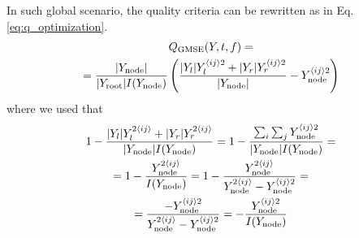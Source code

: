 In such global scenario, the quality criteria can be rewritten as in Eq. \ref{eq:q_optimization}.
%
\begin{multline}
    Q_\text{GMSE}(Y, t, f)
        =\\
            =\frac{|Y_\text{node}|}{|Y_\text{root}|I(Y_\text{node})}
            \left(
                \frac{
                    |Y_l|Y_l^{\langle ij \rangle2} + |Y_r|Y_r^{\langle ij \rangle2}
                }
                    {|Y_\text{node}|}
            - Y_\text{node}^{\langle ij \rangle2}
            \right)
    \label{eq:q_optimization}
\end{multline}
where we used that
\begin{multline*}
            1-\frac{|Y_l| Y_l^{2\langle ij \rangle} + |Y_r|Y_r^{2\langle ij \rangle}}
                {|Y_\text{node}|I(Y_\text{node})}
            =1-\frac{\sum_i \sum_j Y_\text{node}^{\langle ij \rangle2}}
                {|Y_\text{node}|I(Y_\text{node})}=\\
            =1-\frac{Y_\text{node}^{2\langle ij \rangle}}
                {I(Y_\text{node})}
            =1-\frac{Y_\text{node}^{2\langle ij \rangle}}
                {Y_\text{node}^{2\langle ij \rangle}-Y_\text{node}^{\langle ij \rangle2}}=\\
            =\frac{-Y_\text{node}^{\langle ij \rangle2}}
                {Y_\text{node}^{2\langle ij \rangle}-Y_\text{node}^{\langle ij \rangle2}}
            =-\frac{Y_\text{node}^{\langle ij \rangle2}}
                {I(Y_\text{node})}
\end{multline*}

